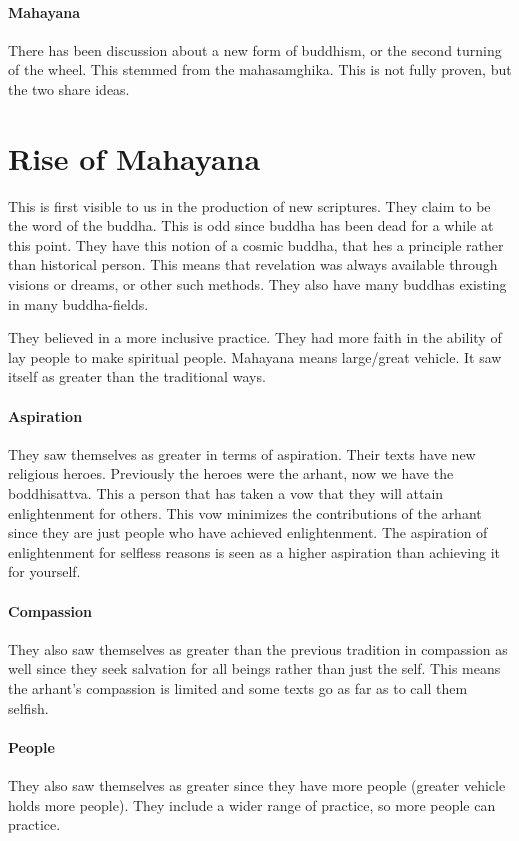 \documentclass{article}
\begin{document}
\paragraph{Mahayana}
\label{par:mahayana}
There has been discussion about a new form of buddhism, or the second turning of the wheel. This stemmed from the mahasamghika. This is not fully proven, but the two share ideas.

\section*{Rise of Mahayana}
\label{sec:rise_of_mahayana}
This is first visible to us in the production of new scriptures. They claim to be the word of the buddha. This is odd since buddha has been dead for a while at this point. They have this notion of a cosmic buddha, that hes a principle rather than historical person. This means that revelation was always available through visions or dreams, or other such methods. They also have many buddhas existing in many buddha-fields.

They believed in a more inclusive practice. They had more faith in the ability of lay people to make spiritual people. Mahayana means large/great vehicle. It saw itself as greater than the traditional ways.

\paragraph{Aspiration}
\label{par:aspiration}
They saw themselves as greater in terms of aspiration. Their texts have new religious heroes. Previously the heroes were the arhant, now we have the boddhisattva. This a person that has taken a vow that they will attain enlightenment for others. This vow minimizes the contributions of the arhant since they are just people who have achieved enlightenment. The aspiration of enlightenment for selfless reasons is seen as a higher aspiration than achieving it for yourself.

\paragraph{Compassion}
\label{par:compassion}
They also saw themselves as greater than the previous tradition in compassion as well since they seek salvation for all beings rather than just the self. This means the arhant's compassion is limited and some texts go as far as to call them selfish.

\paragraph{People}
\label{par:people}
They also saw themselves as greater since they have more people (greater vehicle holds more people). They include a wider range of practice, so more people can practice.
\end{document}
